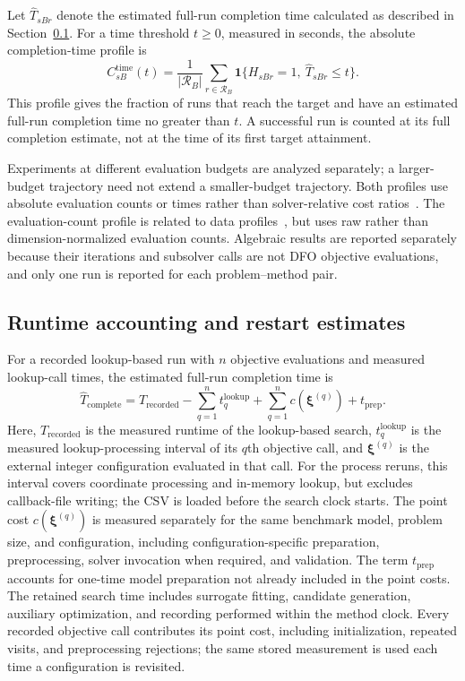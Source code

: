 \documentclass{article}
\begin{document}
Let $\widehat T_{sBr}$ denote the estimated full-run completion time calculated as described in Section~\ref{sec:cost-accounting}.
For a time threshold $t\geq0$, measured in seconds, the absolute completion-time profile is
\begin{equation}\label{eqn:absolute-time}
 C^{\mathrm{time}}_{sB}(t)
 =\frac{1}{|\mathcal R_B|}\sum_{r\in\mathcal R_B}
 \mathbf{1}\{H_{sBr}=1,\ \widehat T_{sBr}\leq t\}.
\end{equation}
This profile gives the fraction of runs that reach the target and have an estimated full-run completion time no greater than $t$.
A successful run is counted at its full completion estimate, not at the time of its first target attainment.

Experiments at different evaluation budgets are analyzed separately; a larger-budget trajectory need not extend a smaller-budget trajectory.
Both profiles use absolute evaluation counts or times rather than solver-relative cost ratios~\cite{dolan2002benchmarking}.
The evaluation-count profile is related to data profiles~\cite{more2009benchmarking}, but uses raw rather than dimension-normalized evaluation counts.
Algebraic results are reported separately because their iterations and subsolver calls are not DFO objective evaluations, and only one run is reported for each problem--method pair.

\subsection{Runtime accounting and restart estimates}
\label{sec:cost-accounting}
For a recorded lookup-based run with $n$ objective evaluations and measured lookup-call times, the estimated full-run completion time is
\begin{equation}\label{eqn:reconstructed-cost}
 \widehat T_{\mathrm{complete}}
 =T_{\mathrm{recorded}}-\sum_{q=1}^{n}t_q^{\mathrm{lookup}}
  +\sum_{q=1}^{n}c(\boldsymbol\xi^{(q)})+t_{\mathrm{prep}}.
\end{equation}
Here, $T_{\mathrm{recorded}}$ is the measured runtime of the lookup-based search, $t_q^{\mathrm{lookup}}$ is the measured lookup-processing interval of its $q$th objective call, and $\boldsymbol\xi^{(q)}$ is the external integer configuration evaluated in that call. For the process reruns, this interval covers coordinate processing and in-memory lookup, but excludes callback-file writing; the CSV is loaded before the search clock starts.
The point cost $c(\boldsymbol\xi^{(q)})$ is measured separately for the same benchmark model, problem size, and configuration, including configuration-specific preparation, preprocessing, solver invocation when required, and validation.
The term $t_{\mathrm{prep}}$ accounts for one-time model preparation not already included in the point costs.
The retained search time includes surrogate fitting, candidate generation, auxiliary optimization, and recording performed within the method clock.
Every recorded objective call contributes its point cost, including initialization, repeated visits, and preprocessing rejections; the same stored measurement is used each time a configuration is revisited.
\end{document}
